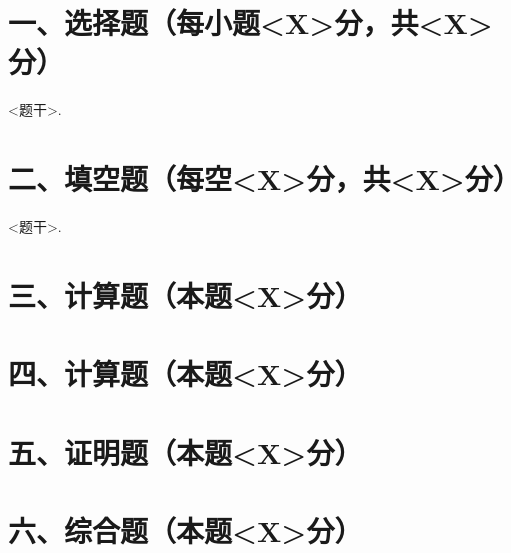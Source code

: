 \documentclass[answerspace=14]{shnu-exam}
\begin{document}
\maketitle

\section{一、选择题（每小题<X>分，共<X>分）}

\question <题干>.

\section{二、填空题（每空<X>分，共<X>分）}

\question <题干>.

\section{三、计算题（本题<X>分）}


\section[newpage]{四、计算题（本题<X>分）}


\section[newpage]{五、证明题（本题<X>分）}


\section[newpage]{六、综合题（本题<X>分）}

\end{document}

